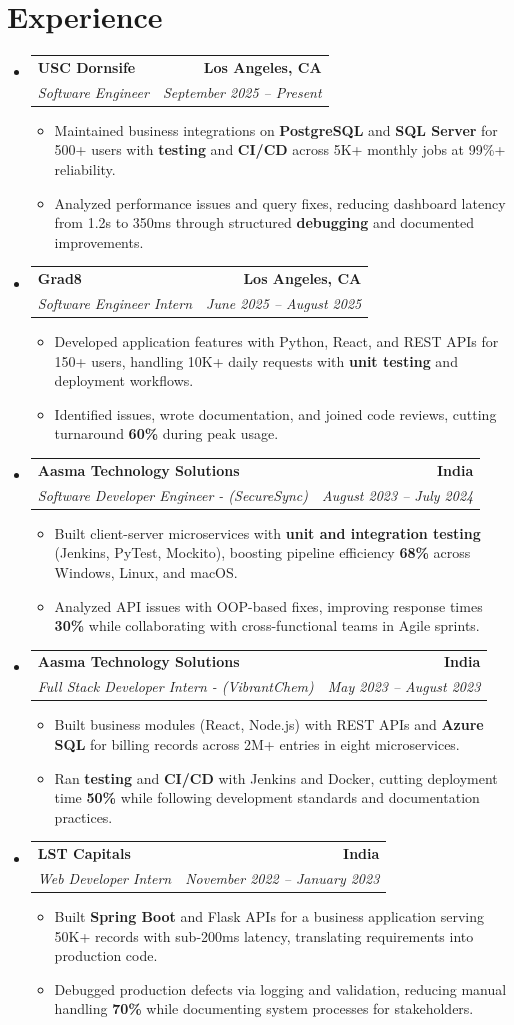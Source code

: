 \documentclass[letterpaper,10pt]{article}
\makeatletter
\newcommand{\resumeItem}[1]{\item\small{{#1 \vspace{-2pt}}}}
\newcommand{\resumeSubheading}[4]{\vspace{-1pt}\item\begin{tabular*}{1.0\textwidth}[t]{l@{\extracolsep{\fill}}r}\textbf{#1} & \textbf{\small #2} \\\textit{\small#3} & \textit{\small #4} \\\end{tabular*}\vspace{-2pt}}
\newcommand{\resumeSubHeadingListStart}{\begin{itemize}[leftmargin=0.0in, label={}]}
\newcommand{\resumeSubHeadingListEnd}{\end{itemize}}
\newcommand{\resumeItemListStart}{\begin{itemize}[leftmargin=0.15in,label=\textbullet,itemsep=2pt,topsep=0pt,parsep=0pt,partopsep=0pt]}
\newcommand{\resumeItemListEnd}{\end{itemize}\vspace{-4pt}}
\makeatother
\begin{document}
\section{Experience}
\resumeSubHeadingListStart
\resumeSubheading{USC Dornsife}{Los Angeles, CA}{Software Engineer}{September 2025 -- Present}
\resumeItemListStart
\resumeItem{Maintained business integrations on \textbf{PostgreSQL} and \textbf{SQL Server} for 500+ users with \textbf{testing} and \textbf{CI/CD} across 5K+ monthly jobs at 99\%+ reliability.}
\resumeItem{Analyzed performance issues and query fixes, reducing dashboard latency from 1.2s to 350ms through structured \textbf{debugging} and documented improvements.}
\resumeItemListEnd
\resumeSubheading{Grad8}{Los Angeles, CA}{Software Engineer Intern}{June 2025 -- August 2025}
\resumeItemListStart
\resumeItem{Developed application features with Python, React, and REST APIs for 150+ users, handling 10K+ daily requests with \textbf{unit testing} and deployment workflows.}
\resumeItem{Identified issues, wrote documentation, and joined code reviews, cutting turnaround \textbf{60\%} during peak usage.}
\resumeItemListEnd
\resumeSubheading{Aasma Technology Solutions}{India}{Software Developer Engineer - (SecureSync)}{August 2023 -- July 2024}
\resumeItemListStart
\resumeItem{Built client-server microservices with \textbf{unit and integration testing} (Jenkins, PyTest, Mockito), boosting pipeline efficiency \textbf{68\%} across Windows, Linux, and macOS.}
\resumeItem{Analyzed API issues with OOP-based fixes, improving response times \textbf{30\%} while collaborating with cross-functional teams in Agile sprints.}
\resumeItemListEnd
\resumeSubheading{Aasma Technology Solutions}{India}{Full Stack Developer Intern - (VibrantChem)}{May 2023 -- August 2023}
\resumeItemListStart
\resumeItem{Built business modules (React, Node.js) with REST APIs and \textbf{Azure SQL} for billing records across 2M+ entries in eight microservices.}
\resumeItem{Ran \textbf{testing} and \textbf{CI/CD} with Jenkins and Docker, cutting deployment time \textbf{50\%} while following development standards and documentation practices.}
\resumeItemListEnd
\resumeSubheading{LST Capitals}{India}{Web Developer Intern}{November 2022 -- January 2023}
\resumeItemListStart
\resumeItem{Built \textbf{Spring Boot} and Flask APIs for a business application serving 50K+ records with sub-200ms latency, translating requirements into production code.}
\resumeItem{Debugged production defects via logging and validation, reducing manual handling \textbf{70\%} while documenting system processes for stakeholders.}
\resumeItemListEnd
\resumeSubHeadingListEnd
\vspace{-6pt}
\end{document}
